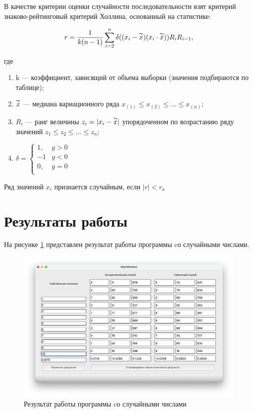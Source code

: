 В качестве критерии оценки случайности последовательности взят
критерий знаково-рейтинговый критерий Холлина, основанный на статистике:

\begin{equation}
	r = \frac{1}{k(n-1)}\sum^{n}_{i=2} \delta ((x_i - \overset{\thicksim}{x})(x_i \cdot \overset{\thicksim}{x})) R_i R_{i-1},
\end{equation}

где

\begin{enumerate}
	\item k --- коэффициент, зависящий от объема выборки (значения подбираются
	по таблице);
	\item $\overset{\thicksim}{x}$ --- медиана вариационного ряда $x_{(1)} \leqslant x_{(2)} \leqslant \dots \leqslant x_{(n)}$;
	\item $R_i$ --- ранг величины $z_i = |x_i - \overset{\thicksim}{x}| $  упорядоченном по возрастанию
	ряду значений $z_{1} \leqslant z_{2} \leqslant \dots \leqslant z_{n}$;
	\item $\delta = 
	\begin{cases}
		1,& y > 0 \\
		-1 & y < 0 \\
		0,& y = 0 \\
	\end{cases}
	$
\end{enumerate}

Ряд значений $x_i$ признается случайным, если $|r| < r_a$ 

\section{Результаты работы}

На рисунке \ref{fig:r2} представлен результат работы программы cо случайными числами.

\begin{figure}[ht!]
	\includegraphics[width=0.75\linewidth]{assets/images/res.png}
	\caption{Результат работы программы cо случайными числами}
	\label{fig:r2}
\end{figure}